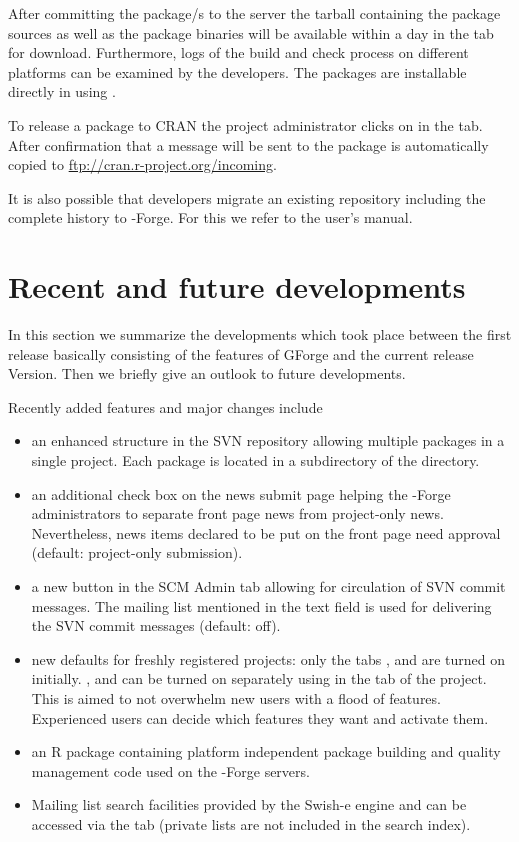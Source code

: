 After committing the package/s to the server the tarball containing
the package sources as well as the package binaries will be available
within a day in the  tab for download. Furthermore,
logs of the build and check process on different platforms 
can be examined by the developers. The packages
are installable directly in \R{} using . 

To release a package to CRAN the project administrator clicks on
 in the  tab. After
confirmation that a message will be sent to 
the package is automatically copied to
\url{ftp://cran.r-project.org/incoming}.

It is also possible that developers migrate an existing repository
including the complete history to \R{}-Forge. For this we refer to the
user's manual.

\section*{Recent and future developments}

In this section we summarize the developments which took place between
the first release basically consisting of the features of GForge and
the current release Version. Then we briefly give an outlook to future
developments.

Recently added features and major changes include

\begin{itemize}
\item an enhanced structure in the SVN repository allowing multiple
  packages in a single project. Each package is located in a
  subdirectory of the  directory.
\item an additional check box on the news submit page helping the
  \R{}-Forge administrators to separate front page news from
  project-only news. Nevertheless, news items declared to be put on
  the front page need approval (default: project-only submission).
\item a new button in the SCM Admin tab allowing for circulation of SVN
  commit messages. The mailing list mentioned in the text field is
  used for delivering the SVN commit messages (default: off).
\item new defaults for freshly registered projects: only the tabs
  ,  and are turned on
  initially. ,  and 
  can be turned on separately using  in
  the  tab of the project. This is aimed to not overwhelm
  new users with a flood of features. Experienced users can decide
  which features they want and activate them.
\item an R{} package containing platform independent package building and quality
  management code used on the \R{}-Forge servers.
\item Mailing list search facilities provided by the Swish-e engine
  and can be accessed via the  tab (private lists
  are not included in the search index).

\end{itemize}

